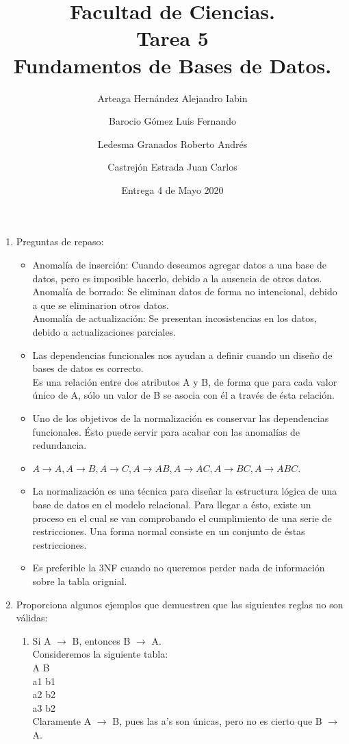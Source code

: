\documentclass{article}
\title{Facultad de Ciencias. \\Tarea 5 \\ Fundamentos de Bases de             Datos.}
\author{Arteaga Hernández Alejandro Iabin \and 
        Barocio Gómez Luis Fernando \and 
        Ledesma Granados Roberto Andrés \and
        Castrejón Estrada Juan Carlos}
\date{Entrega 4 de Mayo 2020}
\begin{document}
\maketitle
\begin{enumerate}
    \item Preguntas de repaso:
    
    \begin{itemize}
    
        \item Anomalía de inserción: Cuando deseamos agregar datos a una base de datos, pero es imposible hacerlo, debido a la ausencia de otros datos.\\
        Anomalía de borrado: Se eliminan datos de forma no intencional, debido a que se eliminarion otros datos.
        \\ Anomalía de actualización: Se presentan incosistencias en los datos, debido a actualizaciones parciales.
        \item Las dependencias funcionales nos ayudan a definir cuando un diseño de bases de datos es correcto.
        \\ Es una relación entre dos atributos A y B, de forma que para cada valor único de A, sólo un valor de B se asocia con él a través de ésta relación.
        \item Uno de los objetivos de la normalización es conservar las dependencias funcionales. Ésto puede servir para acabar con las anomalías de redundancia.
        \item $A \rightarrow A, A \rightarrow B, A \rightarrow C, A \rightarrow AB, A \rightarrow AC, A \rightarrow BC, A \rightarrow ABC.$
        \item La normalización es una técnica para diseñar la estructura lógica de una base de datos en el modelo relacional. Para llegar a ésto, existe un proceso en el cual se van comprobando el cumplimiento de una serie de restricciones. Una forma normal consiste en un conjunto de éstas restricciones.
        \item Es preferible la 3NF cuando no queremos perder nada de información sobre la tabla orignial.
    \end{itemize}
    \item Proporciona algunos ejemplos que demuestren que las siguientes reglas no son válidas:
    \begin{enumerate}
        \item Si A $\rightarrow$ B, entonces B $\rightarrow$ A.\\
        Consideremos la siguiente tabla:\\
        A    B\\
        a1   b1\\
        a2   b2\\
        a3   b2\\
        Claramente A $\rightarrow$ B, pues las a's son únicas, pero no es cierto que B $\rightarrow$ A.
        

\end{enumerate}
\end{enumerate}
\end{document}
